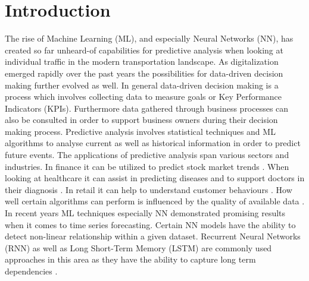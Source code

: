 %
%
% 
% 
% 

\chapter{Introduction}
\label{chap:introduction}
The rise of Machine Learning (ML), and especially Neural Networks (NN), has created so far unheard-of capabilities for predictive analysis when looking at individual traffic in the modern transportation landscape. As digitalization emerged rapidly over the past years the possibilities for data-driven decision making further evolved as well. In general data-driven decision making is a process which involves collecting data to measure goals or Key Performance Indicators (KPIs). Furthermore data gathered through business processes can also be consulted in order to support business owners during their decision making process.
\newline
\newline
Predictive analysis involves statistical techniques and ML algorithms to analyse current as well as historical information in order to predict future events. The applications of predictive analysis span various sectors and industries. In finance it can be utilized to predict stock market trends \cite{stock_market}. When looking at healthcare it can assist in predicting diseases and to support doctors in their diagnosis \cite{health_care}. In retail it can help to understand customer behaviours \cite{retail}. How well certain algorithms can perform is influenced by the quality of available data \cite{data_qual}. In recent years ML techniques especially NN demonstrated promising results when it comes to time series forecasting. Certain NN models have the ability to detect non-linear relationship within a given dataset. Recurrent Neural Networks (RNN) as well as Long Short-Term Memory (LSTM) are commonly used approaches in this area as they have the ability to capture long term dependencies \cite{intro_ml_1}.
\newline
\newline
